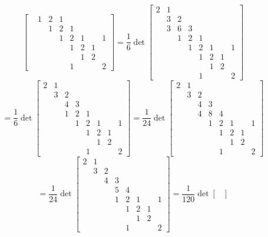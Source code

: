 \documentclass[12pt]{article}
\begin{document}
\begin{itemize}
$$\begin{bmatrix}
& 1 & 2 & 1 \\
& & 1 & 2 & 1 \\
& & & 1 & 2 & 1 & & 1\\
& & & & 1 & 2 & 1 \\
& & & & & 1 & 2 \\
& & & & 1 & & & 2
\end{bmatrix} = \frac{1}{6}\det\begin{bmatrix}
2 & 1 \\
& 3 & 2 \\
& 3 & 6 & 3 \\
& & 1 & 2 & 1 \\
& & & 1 & 2 & 1 & & 1\\
& & & & 1 & 2 & 1 \\
& & & & & 1 & 2 \\
& & & & 1 & & & 2
\end{bmatrix}$$
$$= \frac{1}{6}\det\begin{bmatrix}
2 & 1 \\
& 3 & 2 \\
& & 4 & 3 \\
& & 1 & 2 & 1 \\
& & & 1 & 2 & 1 & & 1\\
& & & & 1 & 2 & 1 \\
& & & & & 1 & 2 \\
& & & & 1 & & & 2
\end{bmatrix} = \frac{1}{24}\det\begin{bmatrix}
2 & 1 \\
& 3 & 2 \\
& & 4 & 3 \\
& & 4 & 8 & 4 \\
& & & 1 & 2 & 1 & & 1\\
& & & & 1 & 2 & 1 \\
& & & & & 1 & 2 \\
& & & & 1 & & & 2
\end{bmatrix}$$
$$= \frac{1}{24}\det\begin{bmatrix}
2 & 1 \\
& 3 & 2 \\
& & 4 & 3 \\
& & & 5 & 4 \\
& & & 1 & 2 & 1 & & 1\\
& & & & 1 & 2 & 1 \\
& & & & & 1 & 2 \\
& & & & 1 & & & 2
\end{bmatrix} = \frac{1}{120}\det\begin{bmatrix}

\end{bmatrix}$$
\end{itemize}
\end{document}
